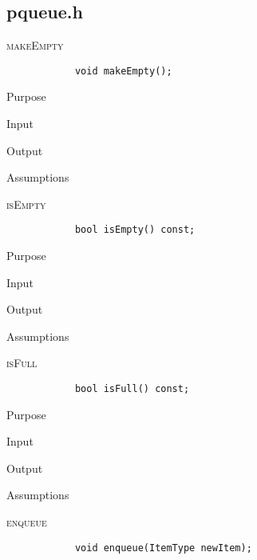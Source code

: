 \documentclass[pdftex, 12pt]{article}
\begin{document}
\subsection{pqueue.h}
\begin{description}

	\item{\textsc{makeEmpty}}
		\begin{lstlisting}
			void makeEmpty();
		\end{lstlisting}
		\begin{description}

			\item{Purpose}

			\item{Input}

			\item{Output}

			\item{Assumptions}

		\end{description}
	\item{\textsc{isEmpty}}
		\begin{lstlisting}
			bool isEmpty() const;
		\end{lstlisting}
		\begin{description}

			\item{Purpose}

			\item{Input}

			\item{Output}

			\item{Assumptions}

		\end{description}
	\item{\textsc{isFull}}
		\begin{lstlisting}
			bool isFull() const;
		\end{lstlisting}
		\begin{description}

			\item{Purpose}

			\item{Input}

			\item{Output}

			\item{Assumptions}

		\end{description}
	\item{\textsc{enqueue}}
		\begin{lstlisting}
			void enqueue(ItemType newItem);
		\end{lstlisting}
		\begin{description}


\end{description}
\end{description}
\end{document}

